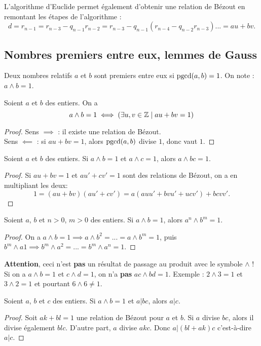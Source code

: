 L'algorithme d'Euclide permet également d'obtenir une relation de Bézout en \og remontant \fg{} les étapes de l'algorithme : 
\[ d = r_{n-1} = r_{n-3} - q_{n-1}r_{n-2} = r_{n-3} - q_{n-1}(r_{n-4} - q_{n-2}r_{n-3})... = au+bv.\]

\subsection{Nombres premiers entre eux, lemmes de Gauss}

\begin{definition}
Deux nombres relatifs $a$ et $b$ sont premiers entre eux si $\operatorname{pgcd}(a,b)=1$. On note :  $a\wedge b = 1$.
\end{definition}

\begin{proposition} Soient $a$ et $b$ des entiers. On a 
\[
a\wedge b = 1 \iff \left(\exists u, v\in \mathbb{Z}\mid au+bv=1\right)
\]
\end{proposition}
\begin{proof}
Sens $\implies$ : il existe une relation de Bézout.\\
Sens $\impliedby$ : si $au+bv=1$, alors  $\operatorname{pgcd}(a,b)$ divise $1$, donc vaut $1$.
\end{proof}

\begin{proposition}
Soient $a$ et $b$ des entiers.
Si $a\wedge b = 1$ et $a\wedge c = 1$, alors $a\wedge bc=1$.
\end{proposition}
\begin{proof}
Si $au+bv=1$ et $au'+cv'=1$ sont des relations de Bézout, on a en multipliant les deux:
\[ 1 = (au+bv)(au'+cv') = a(auu'+bvu'+ucv')+bcvv'.\]
\end{proof}
\begin{corollaire}
Soient $a$, $b$ et $n>0$, $m>0$ des entiers.
Si $a\wedge b = 1$, alors $a^n\wedge b^m=1$.
\end{corollaire}
\begin{proof}
On a $a\wedge b = 1 \implies a\wedge b^2= ... =  a\wedge b^m=1$, puis $b^m\wedge a  1\implies b^m\wedge a^2 = ... = b^m\wedge a^n=1$.
\end{proof}

\textbf{Attention}, ceci n'est \textbf{pas} un résultat de passage au produit avec le symbole $\wedge$ ! Si on a $a\wedge b = 1$ et $c\wedge d = 1$, on n'a \textbf{pas} $ac\wedge bd=1$. Exemple  : $2\wedge 3=1$ et $3\wedge 2=1$ et pourtant $6\wedge 6\neq 1$.

\begin{theoreme}
Soient $a$, $b$ et $c$ des entiers.
Si $a\wedge b = 1$ et $a|bc$, alors $a|c$.
\end{theoreme}
\begin{proof}
Soit $ak+bl=1$ une relation de Bézout pour $a$ et $b$.
Si $a$ divise $bc$, alors il divise également $blc$. D'autre part, $a$ divise $akc$. Donc $a | (bl+ak)c$ c'est-à-dire $a|c$.
\end{proof}

